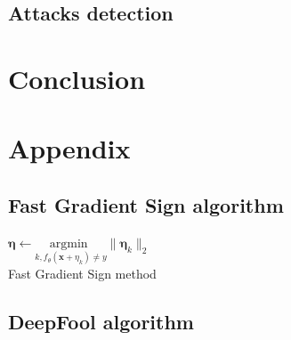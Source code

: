\documentclass[11pt,twocolumn,letterpaper]{article}
\begin{document}
\subsection{Attacks detection}

\paragraph{} 


\section{Conclusion}
\label{sec:conclusion}


\section{Appendix}
\label{sec:appendix}

\subsection{Fast Gradient Sign algorithm}

\begin{algorithm}
\SetAlgoLined
{}
\KwOutput{$\bm{\eta}$}
$\bm{\eta} \leftarrow \underset{k, f_{\theta}(\bm{x} + \eta_k) \neq y}{\text{argmin }} \|\bm{\eta}_k\|_2$ \\
\caption{Fast Gradient Sign method}
\label{algo:fgs}
\end{algorithm}

\subsection{DeepFool algorithm}
\end{document}

